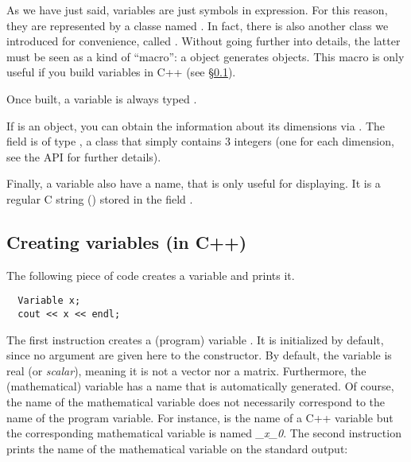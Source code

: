As we have just said, variables are just symbols in expression. For this reason,
they are represented by a classe named .
In fact, there is also another class we introduced for convenience, called .
Without going further into details, the latter must be seen as a kind of ``macro'': a  object
generates  objects. This macro is only useful if you build variables in C++ (see \S\ref{sec:mod-var-cpp}).

Once built, a variable is always typed .

If  is an  object, you can obtain the information about its dimensions via .
The  field is of type , a class that simply contains 3 integers (one for each dimension, see
the API for further details).

Finally, a variable also have a name, that is only useful for displaying. It is a 
regular C string () stored in the field .





\subsection{Creating variables (in C++)}\label{sec:mod-var-cpp}

The following piece of code creates a variable  and prints it.

\begin{lstlisting}
  Variable x;
  cout << x << endl;
\end{lstlisting}

The first instruction creates a (program) variable . It is initialized by default, since
no argument are given here to the constructor.
By default, the variable is real (or {\it scalar}), meaning it is not a vector nor a matrix. 
Furthermore, the (mathematical) variable has a name that is automatically
generated. Of course, the name of the mathematical variable does not necessarily correspond to the name of the 
program variable.
For instance,  is the name of a C++ variable but the corresponding 
mathematical variable is named {\it \_x\_0}.
The second instruction prints the name of the mathematical variable on the standard output:


